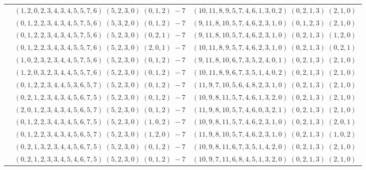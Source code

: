 \documentclass[11pt]{article}
\begin{document}
\begin{longtable}[l]{|c|c|c|}
 \cline{2-3} 
 & $(1 ,2 ,0 ,2 ,3 ,4 ,3 ,4 ,5 ,5 ,7 ,6) \;(5 ,2 ,3 ,0) \;(0 ,1 ,2) \;-7$ & $(10 ,11 ,8 ,9 ,5 ,7 ,4 ,6 ,1 ,3 ,0 ,2) \;(0 ,2 ,1 ,3) \;(2 ,1 ,0) \;$\\ 
 \cline{2-3} 
 & $(0 ,1 ,2 ,2 ,3 ,4 ,3 ,4 ,5 ,7 ,5 ,6) \;(5 ,3 ,2 ,0) \;(0 ,1 ,2) \;-7$ & $(9 ,11 ,8 ,10 ,5 ,7 ,4 ,6 ,2 ,3 ,1 ,0) \;(0 ,1 ,2 ,3) \;(2 ,1 ,0) \;$\\ 
 \cline{2-3} 
 & $(0 ,1 ,2 ,2 ,3 ,4 ,3 ,4 ,5 ,7 ,5 ,6) \;(5 ,2 ,3 ,0) \;(0 ,2 ,1) \;-7$ & $(9 ,11 ,8 ,10 ,5 ,7 ,4 ,6 ,2 ,3 ,1 ,0) \;(0 ,2 ,1 ,3) \;(1 ,2 ,0) \;$\\ 
 \cline{2-3} 
 & $(0 ,1 ,2 ,2 ,3 ,4 ,3 ,4 ,5 ,5 ,7 ,6) \;(5 ,2 ,3 ,0) \;(2 ,0 ,1) \;-7$ & $(10 ,11 ,8 ,9 ,5 ,7 ,4 ,6 ,2 ,3 ,1 ,0) \;(0 ,2 ,1 ,3) \;(0 ,2 ,1) \;$\\ 
 \cline{2-3} 
 & $(1 ,0 ,2 ,3 ,2 ,3 ,4 ,4 ,5 ,7 ,5 ,6) \;(5 ,2 ,3 ,0) \;(0 ,1 ,2) \;-7$ & $(9 ,11 ,8 ,10 ,6 ,7 ,3 ,5 ,2 ,4 ,0 ,1) \;(0 ,2 ,1 ,3) \;(2 ,1 ,0) \;$\\ 
 \cline{2-3} 
 & $(1 ,2 ,0 ,3 ,2 ,3 ,4 ,4 ,5 ,5 ,7 ,6) \;(5 ,2 ,3 ,0) \;(0 ,1 ,2) \;-7$ & $(10 ,11 ,8 ,9 ,6 ,7 ,3 ,5 ,1 ,4 ,0 ,2) \;(0 ,2 ,1 ,3) \;(2 ,1 ,0) \;$\\ 
 \cline{2-3} 
 & $(0 ,1 ,2 ,2 ,3 ,4 ,4 ,5 ,3 ,6 ,5 ,7) \;(5 ,2 ,3 ,0) \;(0 ,1 ,2) \;-7$ & $(11 ,9 ,7 ,10 ,5 ,6 ,4 ,8 ,2 ,3 ,1 ,0) \;(0 ,2 ,1 ,3) \;(2 ,1 ,0) \;$\\ 
 \cline{2-3} 
 & $(0 ,2 ,1 ,2 ,3 ,4 ,3 ,4 ,5 ,6 ,7 ,5) \;(5 ,2 ,3 ,0) \;(0 ,1 ,2) \;-7$ & $(10 ,9 ,8 ,11 ,5 ,7 ,4 ,6 ,1 ,3 ,2 ,0) \;(0 ,2 ,1 ,3) \;(2 ,1 ,0) \;$\\ 
 \cline{2-3} 
 & $(2 ,0 ,1 ,2 ,3 ,4 ,3 ,4 ,5 ,6 ,5 ,7) \;(5 ,2 ,3 ,0) \;(0 ,1 ,2) \;-7$ & $(11 ,9 ,8 ,10 ,5 ,7 ,4 ,6 ,0 ,3 ,2 ,1) \;(0 ,2 ,1 ,3) \;(2 ,1 ,0) \;$\\ 
 \cline{2-3} 
 & $(0 ,1 ,2 ,2 ,3 ,4 ,3 ,4 ,5 ,6 ,7 ,5) \;(5 ,2 ,3 ,0) \;(1 ,0 ,2) \;-7$ & $(10 ,9 ,8 ,11 ,5 ,7 ,4 ,6 ,2 ,3 ,1 ,0) \;(0 ,2 ,1 ,3) \;(2 ,0 ,1) \;$\\ 
 \cline{2-3} 
 & $(0 ,1 ,2 ,2 ,3 ,4 ,3 ,4 ,5 ,6 ,5 ,7) \;(5 ,2 ,3 ,0) \;(1 ,2 ,0) \;-7$ & $(11 ,9 ,8 ,10 ,5 ,7 ,4 ,6 ,2 ,3 ,1 ,0) \;(0 ,2 ,1 ,3) \;(1 ,0 ,2) \;$\\ 
 \cline{2-3} 
 & $(0 ,2 ,1 ,3 ,2 ,3 ,4 ,4 ,5 ,6 ,7 ,5) \;(5 ,2 ,3 ,0) \;(0 ,1 ,2) \;-7$ & $(10 ,9 ,8 ,11 ,6 ,7 ,3 ,5 ,1 ,4 ,2 ,0) \;(0 ,2 ,1 ,3) \;(2 ,1 ,0) \;$\\ 
 \cline{2-3} 
 & $(0 ,2 ,1 ,2 ,3 ,3 ,4 ,5 ,4 ,6 ,7 ,5) \;(5 ,2 ,3 ,0) \;(0 ,1 ,2) \;-7$ & $(10 ,9 ,7 ,11 ,6 ,8 ,4 ,5 ,1 ,3 ,2 ,0) \;(0 ,2 ,1 ,3) \;(2 ,1 ,0) \;$\\ 

\end{longtable}
\end{document}

